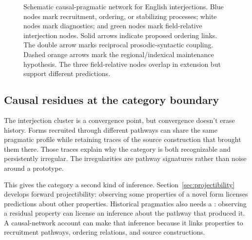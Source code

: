 \documentclass[12pt]{article}
\begin{document}
\begin{figure}[htbp]
{%
}
\caption{Schematic causal-pragmatic network for English interjections.
Blue nodes mark recruitment, ordering, or stabilizing processes; white
nodes mark diagnostics; and green nodes mark field-relative interjection
nodes. Solid arrows indicate proposed ordering links. The double arrow
marks reciprocal prosodic-syntactic coupling. Dashed orange arrows mark
the regional/indexical maintenance hypothesis. The three field-relative
nodes overlap in extension but support different predictions.}
\label{fig:causal-network}
\end{figure}

\subsection{Causal residues at the category boundary}\label{sec:residues}

The interjection cluster is a convergence point, but convergence doesn't
erase history. Forms recruited through different pathways can share the
same pragmatic profile while retaining traces of the source construction
that brought them there. Those traces explain why the category is both
recognizable and persistently irregular. The irregularities are pathway
signatures rather than noise around a prototype.

This gives the category a second kind of inference. Section~\ref{sec:projectibility}
develops forward projectibility: observing some properties of a novel
form licenses predictions about other properties. Historical pragmatics
also needs a :
observing a residual property can license an inference about the pathway
that produced it. A causal-network account can make that inference
because it links properties to recruitment pathways, ordering relations,
and source constructions.
\end{document}
